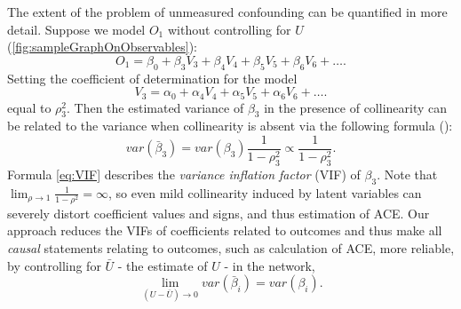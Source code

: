 \documentclass[letterpaper]{article}
\begin{document}
The extent of the problem of unmeasured confounding can be quantified in more detail.  Suppose we model $O_1$ without controlling for $U$ (\ref{fig:sampleGraphOnObservables}): $$O_1 = \beta_0 + \beta_3 V_3 + \beta_4 V_4 + \beta_5 V_5 + \beta_6 V_6 + \dots.$$  Setting the coefficient of determination for the model $$V_3 = \alpha_0 + \alpha_4 V_4 + \alpha_5 V_5 + \alpha_6 V_6 + \dots.$$ equal to $\rho_3^2$.  Then the estimated variance of $\beta_3$ in the presence of collinearity can be related to the variance when collinearity is absent via the following formula (\cite{rawlings_applied_1998}):
\begin{equation}
var(\bar{\beta}_3) = var(\beta_3) \frac{1}{1-\rho_3^2} \propto \frac{1}{1-\rho_3^2}.
\label{eq:VIF}
\end{equation}
Formula \ref{eq:VIF} describes the \textit{variance inflation factor} (VIF) of $\beta_3$.  Note that $\lim_{\rho \to 1} \frac{1}{1-\rho^2} = \infty$, so even mild collinearity induced by latent variables can severely distort coefficient values and signs, and thus estimation of ACE.  Our approach reduces the VIFs of coefficients related to outcomes and thus make all \textit{causal} statements relating to outcomes, such as calculation of ACE, more reliable, by controlling for $\bar{U}$ - the estimate of $U$ - in the network,
\begin{equation}
\lim_{(U - \bar{U})\to0} var(\bar{\beta}_i) = var(\beta_i).
\label{eq:vifImprovement}
\end{equation}
\end{document}
